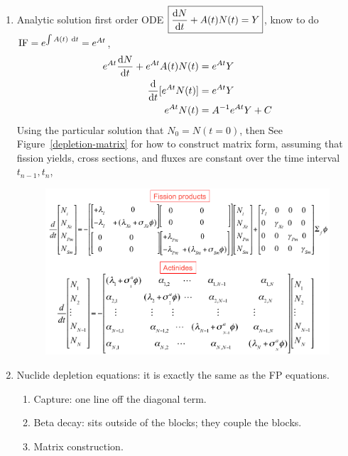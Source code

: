 \documentclass{school-22.211-notes}
\begin{document}
\begin{enumerate}
  \item Analytic solution first order ODE $\boxed{\frac{\mathrm{d}N}{\mathrm{d}t} + A(t) N(t) = Y }$, know to do $\mbox{IF} = e^{\int A(t) \mbox{ }\mathrm{d} t} = e^{At}$, 
    \begin{align}
      e^{At} \frac{\mathrm{d}N}{\mathrm{d}t} + e^{At} A(t) N(t) &= e^{At} Y \\
      \frac{\mathrm{d}}{\mathrm{d}t}[e^{At} N(t) ] &= e^{At} Y \\
      e^{At} N(t) &= A^{-1} e^{At} Y + C 
    \end{align}
    Using the particular solution that $N_0 = N(t=0)$, then 
    See Figure~\ref{depletion-matrix} for how to construct matrix form, assuming that fission yields, cross sections, and fluxes are constant over the time interval $t_{n-1}, t_n$,
    \begin{figure}[ht]
      \centering
      \includegraphics[width=5in]{images/dfs/fp-an-matrix-form.png} 
    \end{figure}

\item Nuclide depletion equations: it is exactly the same as the FP equations. 
  \begin{enumerate}
  \item Capture: one line off the diagonal term. 
  \item Beta decay: sits outside of the blocks; they couple the blocks. 
  \item Matrix construction. 
  \end{enumerate}



\end{enumerate}
\end{document}
